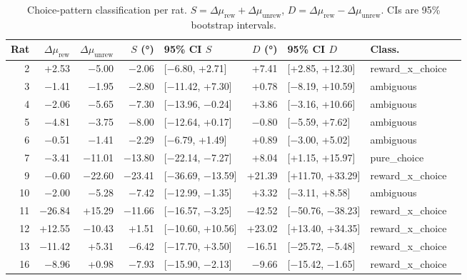 \begin{table}[htbp]
  \centering
  \caption{Choice-pattern classification per rat. $S = \Delta\mu_{\mathrm{rew}} + \Delta\mu_{\mathrm{unrew}}$, $D = \Delta\mu_{\mathrm{rew}} - \Delta\mu_{\mathrm{unrew}}$. CIs are 95\% bootstrap intervals.}
  \label{tab:choice_pattern}
  \begin{tabular}{rrrrlrlll}
    \toprule
    Rat & $\Delta\mu_{\mathrm{rew}}$ & $\Delta\mu_{\mathrm{unrew}}$ & $S$ (°) & 95\% CI $S$ & $D$ (°) & 95\% CI $D$ & Class. \\
    \midrule
    2 & +2.53 & −5.00 & −2.06 & [−6.80, +2.71] & +7.41 & [+2.85, +12.30] & reward\_x\_choice \\
    3 & −1.41 & −1.95 & −2.80 & [−11.42, +7.30] & +0.78 & [−8.19, +10.59] & ambiguous \\
    4 & −2.06 & −5.65 & −7.30 & [−13.96, −0.24] & +3.86 & [−3.16, +10.66] & ambiguous \\
    5 & −4.81 & −3.75 & −8.00 & [−12.64, +0.17] & −0.80 & [−5.59, +7.62] & ambiguous \\
    6 & −0.51 & −1.41 & −2.29 & [−6.79, +1.49] & +0.89 & [−3.00, +5.02] & ambiguous \\
    7 & −3.41 & −11.01 & −13.80 & [−22.14, −7.27] & +8.04 & [+1.15, +15.97] & pure\_choice \\
    9 & −0.60 & −22.60 & −23.41 & [−36.69, −13.59] & +21.39 & [+11.70, +33.29] & reward\_x\_choice \\
    10 & −2.00 & −5.28 & −7.42 & [−12.99, −1.35] & +3.32 & [−3.11, +8.58] & ambiguous \\
    11 & −26.84 & +15.29 & −11.66 & [−16.57, −3.25] & −42.52 & [−50.76, −38.23] & reward\_x\_choice \\
    12 & +12.55 & −10.43 & +1.51 & [−10.60, +10.56] & +23.02 & [+13.40, +34.35] & reward\_x\_choice \\
    13 & −11.42 & +5.31 & −6.42 & [−17.70, +3.50] & −16.51 & [−25.72, −5.48] & reward\_x\_choice \\
    16 & −8.96 & +0.98 & −7.93 & [−15.90, −2.13] & −9.66 & [−15.42, −1.65] & reward\_x\_choice \\
    \bottomrule
  \end{tabular}
\end{table}
